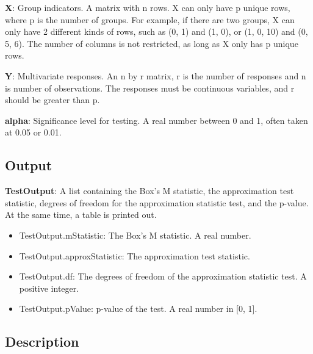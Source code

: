 \documentclass[a4paper,11pt,openany]{memoir}
\begin{document}
\begin{par}
\textbf{X}: Group indicators. A matrix with n rows.  X can only have p unique  rows, where p is the number of groups. For example, if there are two groups, X can only have 2 different kinds of rows, such as (0, 1) and (1, 0), or (1, 0, 10) and (0, 5, 6).  The number of columns is not restricted, as long as X only has p unique rows.
\end{par} \vspace{1em}
\begin{par}
\textbf{Y}: Multivariate responses. An n by r matrix, r is the number of responses and n is number of observations. The responses must be continuous variables, and r should be greater than p.
\end{par} \vspace{1em}
\begin{par}
\textbf{alpha}: Significance level for testing.  A real number between 0 and 1, often taken at 0.05 or 0.01.
\end{par} \vspace{1em}


\subsection*{Output}

\begin{par}
\textbf{TestOutput}: A list containing the Box's M statistic, the approximation test statistic, degrees of freedom for the approximation statistic test, and the p-value.  At the same time, a table is printed out.
\end{par} \vspace{1em}
\begin{itemize}
\setlength{\itemsep}{-1ex}
   \item TestOutput.mStatistic: The Box's M statistic. A real number.
   \item TestOutput.approxStatistic: The approximation test statistic.
   \item TestOutput.df: The degrees of freedom of the approximation statistic test.  A positive integer.
   \item TestOutput.pValue: p-value of the test.  A real number in [0, 1].
\end{itemize}


\subsection*{Description}
\end{document}
